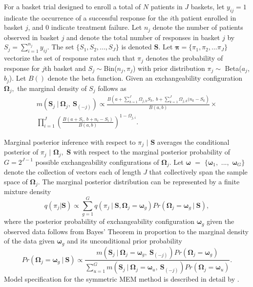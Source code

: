 For a basket trial designed to enroll a total of $N$ patients in $J$ baskets, let $y_{ij} = 1$ indicate the occurrence of a successful response for the $i$th patient enrolled in basket $j$, and 0 indicate treatment failure. Let $n_j$ denote the number of patients observed in basket $j$ and denote the total number of responses in basket $j$ by $S_j = \sum_{i=1}^{n_j} y_{ij}$. The set $\{S_1, S_2, ..., S_J\}$ is denoted ${\bm S}$.  Let ${\bm \pi} = \{\pi_1, \pi_2, ... \pi_J\}$ vectorize the set of response rates such that $\pi_j$ denotes the probability of response for $j$th basket and $S_j \sim $Bin($n_j, \pi_j$) with prior distribution $\pi_j \sim$ Beta($a_j$, $b_j$). Let $B()$ denote the beta function. Given an exchangeability configuration $\bm{\Omega}_j,$ the marginal density of $S_j$ follows as \citep[see][for details]{hobbs2018monitor}
\begin{equation} \begin{split}\label{margData}
m(\bm{S}_j\:|\: \bm{\Omega}_{j},\: \bm{S}_{(-j)}) \propto \frac{B\left(
	a + \sum_{h=1}^{J} \Omega_{j,h} S_{h} ,\: b + \sum_{k=1}^{J} \Omega_{j,k}(n_{k} - S_{k}
	\right)}{B(a,b)} \times \\ 
\prod_{i=1}^{J}  \left(\frac{B(a + S_{i},\: b + n_{i} - S_{i})}{B(a,b)}\right)^{1-\Omega_{j,i}}.
\end{split} \end{equation}

Marginal posterior inference with respect to $\pi_j$ $|$ $\bm{S}$ averages the conditional posterior of $\pi_j$ $|$ $\bm{\Omega}_{j},$ $\bm{S}$  with respect to the marginal posterior probability of $G=2^{J-1}$ possible exchangeability configurations of $\bm{\Omega}_j.$ Let $\bm{\omega}$ $=$ $\{\bm{\omega}_1,$ $...,$ $\bm{\omega}_G\}$ denote the collection of vectors each of length $J$ that collectively span the sample space of $\bm{\Omega}_j.$ The marginal posterior distribution can be represented by a finite mixture density
\begin{equation} \label{margPost}
q(\pi_{j}|\bm{S}) \propto \sum_{g=1}^{G} q(\pi_j\: |\: \bm{S}, \bm{\Omega}_j=\bm{\omega}_g)Pr(\bm{\Omega}_j=\bm{\omega}_g\: |\: \bm{S}),
\end{equation}
where the posterior probability of exchangeability configuration $\bm{\omega}_g$ given the observed data follows from Bayes' Theorem in proportion to the marginal density of the data given $\bm{\omega}_g$ and its unconditional prior probability %
\begin{equation} \label{modelProb}
Pr(\bm{\Omega}_j=\bm{\omega}_g\: |\: \bm{S}) \propto \frac{m(\bm{S}_j\:|\: \bm{\Omega}_{j}=\bm{\omega}_g,\: \bm{S}_{(-j)}) Pr(\bm{\Omega}_{j}=\bm{\omega}_g)}{\sum_{u=1}^{G} m(\bm{S}_j\:|\: \bm{\Omega}_{j}=\bm{\omega}_u,\: \bm{S}_{(-j)}) Pr(\bm{\Omega}_{j}=\bm{\omega}_u) }.
\end{equation}
Model specification for the symmetric MEM method is described in detail by \cite{hobbs2018monitor}.

